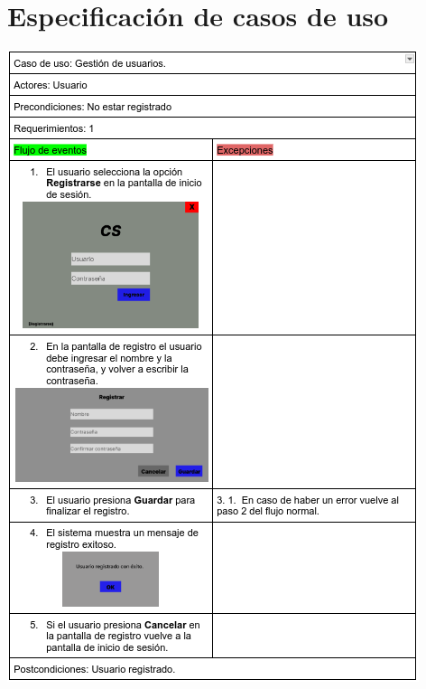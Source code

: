 \documentclass{article}
\begin{document}
\section{Especificación de casos de uso}
	\includegraphics[width=1\linewidth]{imagenes/especificacion_usuario.png}
\end{document}
